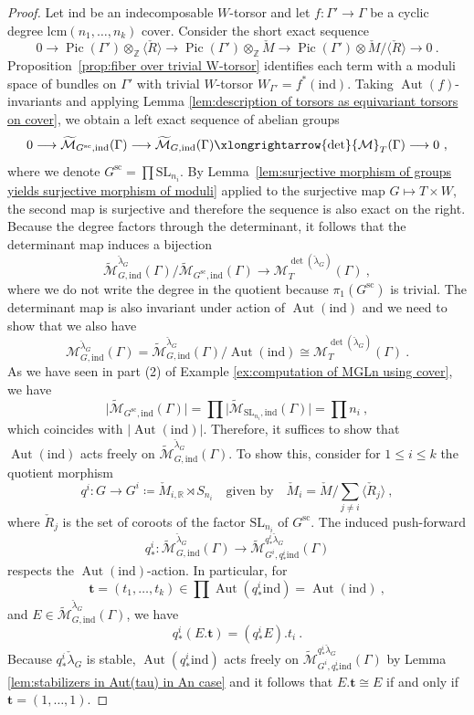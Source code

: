 \documentclass[10pt, a4paper]{amsart}
\theoremstyle{definition}
\theoremstyle{myitemstyle}
\newcommand{\R}{\mathbb{R}}
\newcommand{\Z}{\mathbb{Z}}
\newcommand{\Mcheck}{{\check{M}}}
\newcommand{\lambdacheck}{\check{\lambda}}
\newcommand{\Rcheck}{\check{R}}
\newcommand{\mc}[1]{{\mathcal{#1}}}
\newcommand{\wmc}[1]{{\widetilde{\mathcal{#1}}}}
\DeclareMathOperator{\Pic}{Pic}
\DeclareMathOperator{\Aut}{Aut}
\newcommand{\SL}{{\mathrm{SL}}}
\newcommand{\simc}{\mathrm{sc}}
\newcommand{\ind}{\mathrm{ind}}
\newcommand{\Ga}{\Gamma}
\begin{document}
\begin{proof}
Let $\ind$ be an indecomposable $W$-torsor and let $f\colon \Gamma'\to \Gamma$ be a cyclic degree $\mathrm{lcm}(n_1,\ldots, n_k)$ cover. Consider the short exact sequence
\[
    0 \longrightarrow 
        \Pic(\Gamma')\otimes_\Z \langle \Rcheck\rangle \longrightarrow
            \Pic(\Gamma')\otimes_\Z\Mcheck  
                \longrightarrow \Pic(\Gamma')\otimes \Mcheck/\langle\Rcheck\rangle \longrightarrow
                    0\ .
\]
Proposition~\ref{prop:fiber over trivial W-torsor} identifies each term with a moduli space of bundles on $\Ga'$ with trivial $W$-torsor $W_{\Ga'}=f^*(\ind)$. Taking $\Aut(f)$-invariants and applying Lemma \ref{lem:description of torsors as equivariant torsors on cover}, we obtain a left exact sequence of abelian groups
\[
0 \longrightarrow 
    \wmc M_{G^{\simc},\ind}(\Ga) \longrightarrow 
        \wmc M_{G,\ind}(\Ga) \xlongrightarrow{\det} 
            \mc M_{T}(\Ga) \longrightarrow
                0 \ ,
\]
where we denote $G^{\simc}=\prod \SL_{n_i}$. By Lemma~\ref{lem:surjective morphism of groups yields surjective morphism of moduli} applied to the surjective map $G\mapsto T\times W$, the second map is surjective and therefore the sequence is also exact on the right. Because the degree factors through the determinant, it follows that the determinant map induces a bijection
\[
    \wmc M^{\lambdacheck_G}_{G,\ind}(\Ga)/\wmc M_{G^{\simc},\ind}(\Ga) \longrightarrow 
        \mc M^{\det(\lambdacheck_G)}_{T}(\Ga) \ ,
\]
where we do not write the degree in the quotient because $\pi_1(G^{\simc})$ is trivial. The determinant map is also invariant under action of $\Aut(\ind)$ and we need to show that we also have
\[
    \mc M^{\lambdacheck_G}_{G,\ind}(\Ga)=\wmc M^{\lambdacheck_G}_{G,\ind}(\Ga)/\Aut(\ind)\cong 
        \mc M^{\det(\lambdacheck_G)}_{T}(\Ga) \ .
\]
As we have seen in part (2) of Example \ref{ex:computation of MGLn using cover}, we have 
\[
    \big|\wmc M_{G^{\simc},\ind}(\Gamma)\big|=\prod \big|\wmc M_{\SL_{n_i},\ind}(\Gamma)\big| =\prod n_i\ ,
\]
which coincides with $\big|\Aut(\ind)\big|$. Therefore, it suffices to show that $\Aut(\ind)$ acts freely on $\wmc M^{\lambdacheck_G}_{G,\ind}(\Ga)$. To show this, consider for $1\leq i\leq k$ the quotient morphism
\[
    q^i\colon G\to G^i\coloneqq \Mcheck_{i,\R} \rtimes S_{n_i}\quad\text{given by}\quad \Mcheck_i=\Mcheck /\sum_{j\neq i} \langle \Rcheck_j\rangle 
    \ ,
\]
where $\Rcheck_j$ is the set of coroots of the factor $\SL_{n_i}$ of $G^{\simc}$. The induced push-forward
\[
q^i_*\colon \wmc M^{\lambdacheck_G}_{G,\ind}(\Ga)\longrightarrow \wmc M^{q^i_*\lambdacheck_G}_{G^i,q^i_*\ind}(\Ga) 
\]
respects the $\Aut(\ind)$-action. In particular, for 
\[
    \mathbf t=(t_1,\ldots, t_k)\in \prod \Aut(q^i_*\ind)=\Aut(\ind) \ ,
\]
and $E\in \wmc M^{\lambdacheck_G}_{G,\ind}(\Ga)$, we have
\[
    q^i_*(E.\mathbf t)= (q^i_*E).t_i \ .
\]
Because $q^i_*\lambdacheck_G$ is stable, $\Aut(q^i_*\ind)$ acts freely on $\wmc M^{q^i_*\lambdacheck_G}_{G^i,q^i_*\ind}(\Ga)$ by Lemma \ref{lem:stabilizers in Aut(tau) in An case} and it follows that $E.\mathbf t\cong E$ if and only if $\mathbf t=(1,\ldots,1)$.
\end{proof}
\end{document}
